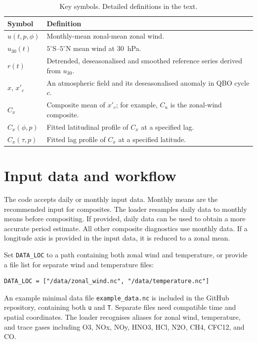 \documentclass[11pt,a4paper]{article}
\begin{document}
\begin{table}
\centering
\caption{Key symbols. Detailed definitions in the text.}
\begin{tabularx}{\textwidth}{@{}
>{\raggedright\arraybackslash}p{}X@{}}
\toprule
Symbol & Definition \\
\midrule
$u(t,p,\phi)$ & Monthly-mean zonal-mean zonal wind. \\
$u_{30}(t)$ & $5^{\circ}$S--$5^{\circ}$N mean wind at 30~hPa. \\
$r(t)$ &  Detrended, deseasonalised and smoothed reference series derived from $u_{30}$. \\
$x$, $x'_c$ & An atmospheric field and its deseasonalised anomaly in QBO
cycle $c$. \\
$C_x$ & Composite mean of $x'_c$; for example, $C_u$ is the zonal-wind composite. \\
$\widehat{C}_x(\phi,p)$ & Fitted latitudinal profile of $C_x$ at a specified lag. \\
$\widehat{C}_x(\tau,p)$ & Fitted lag profile of $C_x$ at a specified latitude. \\
\bottomrule
\end{tabularx}
\end{table}

\section{Input data and workflow}

The code accepts daily or monthly input data. Monthly means are the recommended input for composites. The loader
resamples daily data to monthly means before compositing. If provided, daily data can be used to obtain a more
accurate period estimate. All other composite diagnostics use monthly data. If a longitude axis is provided in
the input data, it is reduced to a zonal mean.

Set \texttt{DATA\_LOC} to a path containing both zonal wind and temperature, or provide a file list for separate
wind and temperature files:
\begin{verbatim}
DATA_LOC = ["/data/zonal_wind.nc", "/data/temperature.nc"]
\end{verbatim}

An example minimal data file \texttt{example\_data.nc} is included in the GitHub repository,
containing both \texttt{u} and \texttt{T}. Separate files need compatible time and spatial coordinates. The
loader recognises aliases for zonal wind, temperature, and trace gases including O3, NOx, NOy, HNO3, HCl, N2O,
CH4, CFC12, and CO.
\end{document}
